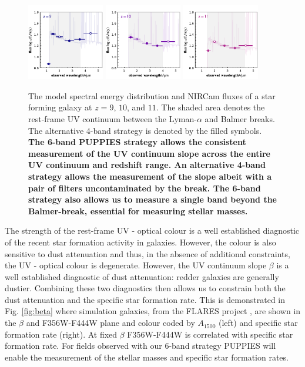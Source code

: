 \documentclass[12pt]{article}
\begin{document}
\begin{figure}[h!]
    \centering
    \includegraphics[width=0.3\textwidth]{figs/SED_9.pdf}
    \includegraphics[width=0.3\textwidth]{figs/SED_10.pdf}
    \includegraphics[width=0.3\textwidth]{figs/SED_11.pdf}
    \caption{The model spectral energy distribution and NIRCam fluxes of a star forming galaxy at $z=9$, $10$, and $11$. The shaded area denotes the rest-frame UV continuum between the Lyman-$\alpha$ and Balmer breaks. The alternative 4-band strategy is denoted by the filled symbols. \textbf{The 6-band PUPPIES strategy allows the consistent measurement of the UV continuum slope across the entire UV continuum and redshift range. An alternative 4-band strategy allows the measurement of the slope albeit with a pair of filters uncontaminated by the break. The 6-band strategy also allows us to measure a single band beyond the Balmer-break, essential for measuring stellar masses.}}
    \label{fig:SED}
\end{figure}

The strength of the rest-frame UV - optical colour is a well established diagnostic of the recent star formation activity in galaxies. However, the colour is also sensitive to dust attenuation and thus, in the absence of additional constraints, the UV - optical colour is degenerate. However, the UV continuum slope $\beta$ is a well established diagnostic of dust attenuation: redder galaxies are generally dustier. Combining these two diagnostics then allows us to constrain both the dust attenuation and the specific star formation rate. This is demonstrated in  Fig. \ref{fig:beta} where simulation galaxies, from the FLARES project \citep{2020MNRAS.tmp.3168L}, are shown in the $\beta$ and F356W-F444W plane and colour coded by $A_{1500}$ (left) and specific star formation rate (right). At fixed $\beta$ F356W-F444W is correlated with specific star formation rate. For fields observed with our 6-band strategy PUPPIES will enable the measurement of the stellar masses and specific star formation rates.
\end{document}
